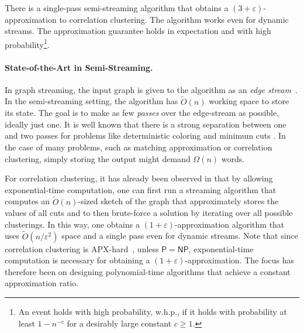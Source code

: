 \documentclass{theoretics}
\newcommand{\eps}{\ensuremath{\varepsilon}}
\begin{document}
\begin{theorem*}
    There is a single-pass semi-streaming algorithm that obtains a $(3 + \eps)$-approximation to correlation clustering. The algorithm works even for dynamic streams. The approximation guarantee holds in expectation and with high probability\footnote{An event holds with high probability, w.h.p., if it holds with probability at least $1 - n^{-c}$ for a desirably large constant $c \geq 1$.}.
\end{theorem*}


\paragraph{State-of-the-Art in Semi-Streaming.}
In graph streaming, the input graph is given to the algorithm as an \emph{edge stream}~\cite{Feigenbaum2005, Feigenbaum2005a, Mut2005}.
In the semi-streaming setting, the algorithm has $\widetilde{O}(n)$ working space to store its state.
The goal is to make as few \emph{passes} over the edge-stream as possible, ideally just one. It is well known that there is a strong separation between one and two passes for problems like deterministic coloring \cite{assadi2022deterministic} and minimum cuts \cite{AssadiD2021}.
In the case of many problems, such as matching approximation or correlation clustering, simply storing the output might demand $\Omega(n)$ words.

For correlation clustering, it has already been observed in \cite{ahn2015correlation,behnezhad2023single} that by allowing exp\-onential-time computation, one can first run a streaming algorithm that computes an $\widetilde{O}(n)$-sized sketch of the graph that approximately stores the values of all cuts \cite{AGM12} and to then brute-force a solution by iterating over all possible clusterings. 
In this way, one obtains a $(1+\eps)$-approximation algorithm that uses $\widetilde{O}(n/\eps^2)$ space and a single pass even for dynamic streams. Note that since correlation clustering is APX-hard~\cite{charikar2005clustering}, unless $\mathsf{P}=\mathsf{NP}$, exponential-time computation is necessary for obtaining a $(1+\eps)$-approximation. The focus has therefore been on designing polynomial-time algorithms that achieve a constant approximation ratio.
\end{document}
